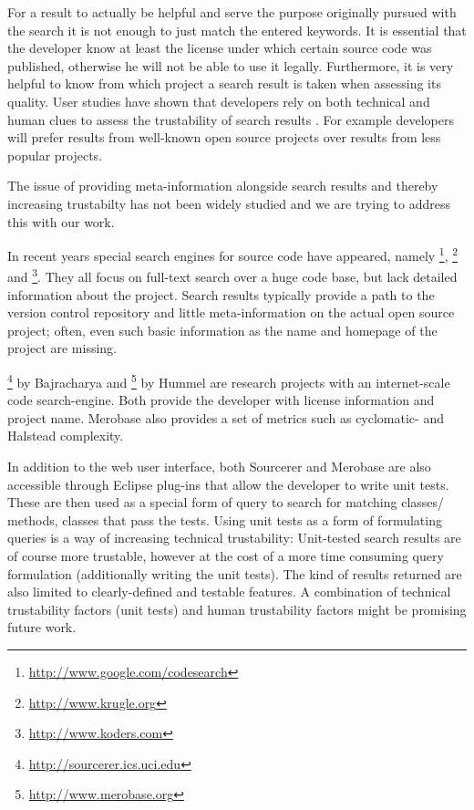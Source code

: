 For a result to actually be helpful and serve the purpose originally pursued with the search it is not enough to just match the entered keywords.
It is essential that the developer know at least the license under which certain source code was published, otherwise he will not be able to use it legally. Furthermore, it is very helpful to know from which project a search result is taken when assessing its quality.
User studies have shown that developers rely on both technical and human clues to assess the trustability of search results \cite{Gall09a}. For example developers will prefer results from well-known open source projects over results from less popular projects.

The issue of providing meta-information alongside search results and thereby increasing trustabilty has not been widely studied and we are trying to address this with our work.

In recent years special search engines for source code have appeared, namely  \textsc{\gcs}\footnote{\url{http://www.google.com/codesearch}}, \textsc{\krugle}\footnote{\url{http://www.krugle.org}} and  \textsc{\koders}\footnote{\url{http://www.koders.com}}. They all focus on full-text search over a huge code base, but lack detailed information about the project. Search results typically provide a path to the version control repository and little meta-information on the actual open source project; often, even such basic information as the name and homepage of the project are missing.

\textsc{\sourcerer}\footnote{\url{http://sourcerer.ics.uci.edu}} by Bajracharya \etal \cite{Bajr06a} and \textsc{\merobase}\footnote{\url{http://www.merobase.org}} by Hummel \etal \cite{Humm08a} are research projects with an internet-scale code search-engine. Both provide the developer with license information and project name. Merobase also provides a set of metrics such as cyclomatic- and Halstead complexity.  

In addition to the web user interface, both Sourcerer and Merobase are also accessible through Eclipse plug-ins that allow the developer to write unit tests. These are then used as a special form of query to search for matching classes/ methods, \ie classes that pass the tests\cite{Humm08a}. Using unit tests as a form of formulating queries is a way of increasing technical trustability: Unit-tested search results are of course more trustable, however at the cost of a more time consuming query formulation (\ie additionally writing the unit tests). The kind of results returned are also limited to clearly-defined and testable features.  A combination of technical trustability factors (\eg unit tests) and human trustability factors might be promising future work.

